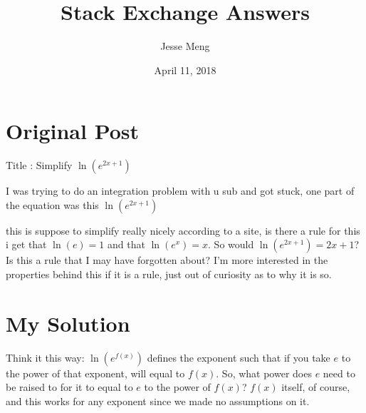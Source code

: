 \documentclass{article}
\title{Stack Exchange Answers}
\author{Jesse Meng }
\date{April 11, 2018}
\begin{document}
\maketitle

\section{Original Post}
Title : Simplify $\ln(e^{2x+1})$

I was trying to do an integration problem with u sub and got stuck, one part of the equation was this
$\ln(e^{2x+1})$

this is suppose to simplify really nicely according to a site, is there a rule for this i get that $\ln(e) =1$ and that $\ln(e^{x})=x$. So would $\ln(e^{2x+1})=2x+1$? Is this a rule that I may have forgotten about?
I'm more interested in the properties behind this if it is a rule, just out of curiosity as to why it is so.
\section{My Solution}
Think it this way: $\ln(e^{f(x)})$ defines the exponent such that if you take $e$ to the power of that exponent, will equal to $f(x)$. So, what power does $e$ need to be raised to for it to equal to $e$ to the power of $f(x)$? $f(x)$ itself, of course, and this works for any exponent since we made no assumptions on it.
\end{document}
